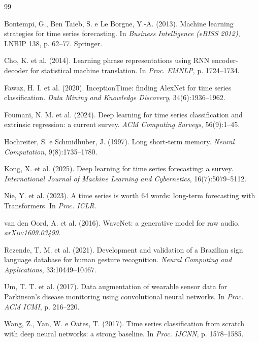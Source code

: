 \documentclass[12pt]{article}
\begin{document}
\begin{thebibliography}{99}\footnotesize\setlength{\itemsep}{0pt}

Bontempi, G., Ben Taieb, S. e Le Borgne, Y.-A. (2013). Machine learning strategies for time series forecasting. In \textit{Business Intelligence (eBISS 2012)}, LNBIP 138, p. 62--77. Springer.

Cho, K. et al. (2014). Learning phrase representations using RNN encoder-decoder for statistical machine translation. In \textit{Proc. EMNLP}, p. 1724--1734.

Fawaz, H. I. et al. (2020). InceptionTime: finding AlexNet for time series classification. \textit{Data Mining and Knowledge Discovery}, 34(6):1936--1962.

Foumani, N. M. et al. (2024). Deep learning for time series classification and extrinsic regression: a current survey. \textit{ACM Computing Surveys}, 56(9):1--45.

Hochreiter, S. e Schmidhuber, J. (1997). Long short-term memory. \textit{Neural Computation}, 9(8):1735--1780.

Kong, X. et al. (2025). Deep learning for time series forecasting: a survey. \textit{International Journal of Machine Learning and Cybernetics}, 16(7):5079--5112.

Nie, Y. et al. (2023). A time series is worth 64 words: long-term forecasting with Transformers. In \textit{Proc. ICLR}.

van den Oord, A. et al. (2016). WaveNet: a generative model for raw audio. \textit{arXiv:1609.03499}.

Rezende, T. M. et al. (2021). Development and validation of a Brazilian sign language database for human gesture recognition. \textit{Neural Computing and Applications}, 33:10449--10467.

Um, T. T. et al. (2017). Data augmentation of wearable sensor data for Parkinson's disease monitoring using convolutional neural networks. In \textit{Proc. ACM ICMI}, p. 216--220.

Wang, Z., Yan, W. e Oates, T. (2017). Time series classification from scratch with deep neural networks: a strong baseline. In \textit{Proc. IJCNN}, p. 1578--1585.

\end{thebibliography}
\end{document}

